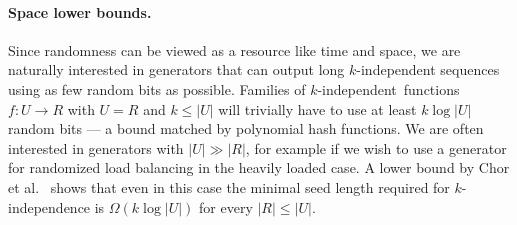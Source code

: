 \documentclass[a4paper,11pt]{article}
\theoremstyle{plain}
\theoremstyle{definition}
\begin{document}
\paragraph{Space lower bounds.}
Since randomness can be viewed as a resource like time and space, we are naturally interested in generators that can output long $k$-independent sequences using as few random bits as possible. 
Families of \mbox{$k$-independent functions} $f : U \rightarrow R$ with $U = R$ and $k \leq |U|$ will trivially have to use at least $k \log |U|$ random bits --- a bound matched by polynomial hash functions. 
We are often interested in generators with $|U| \gg |R|$, for example if we wish to use a generator for randomized load balancing in the heavily loaded case. 
A lower bound by Chor et al.~\cite{chor1985} shows that even in this case the minimal seed length required for $k$-independence is $\Omega(k \log |U|)$ for every $|R| \leq |U|$.
\end{document}
